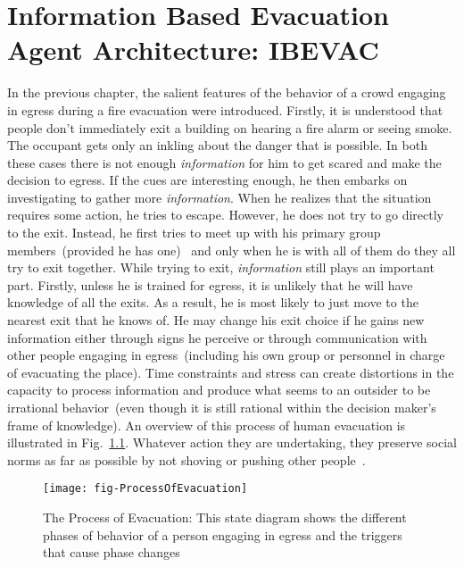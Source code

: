 
\chapter{Information Based Evacuation Agent Architecture: IBEVAC}
\label{chapter:IBEVAC}

In the previous chapter, the salient features of the behavior of a crowd engaging in egress during a fire evacuation were introduced. Firstly, it is understood that people don't immediately exit a building on hearing a fire alarm or seeing smoke. The occupant gets only an inkling about the danger that is possible. In both these cases there is not enough \emph{information} for him to get scared and make the decision to egress. If the cues are interesting enough, he then embarks on investigating to gather more \emph{information}. When he realizes that the situation requires some action, he tries to escape. However, he does not try to go directly to the exit. Instead, he first tries to meet up with his primary group members~(provided he has one)~\cite{Sime:1983uy,Torres:2010tj,Cornwell:2003uo,Aveni:1997wq} and only when he is with all of them do they all try to exit together. While trying to exit, \emph{information} still plays an important part. Firstly, unless he is trained for egress, it is unlikely that he will have knowledge of all the exits. As a result, he is most likely to just move to the nearest exit that he knows of. He may change his exit choice if he gains new information either through signs he perceive or through communication with other people engaging in egress~(including his own group or personnel in charge of evacuating the place). Time constraints and stress can create distortions in the capacity to process information and produce what seems to an outsider to be irrational behavior~(even though it is still rational within the decision maker's frame of knowledge). An overview of this process of human evacuation is illustrated in Fig.~\ref{fig:EvacuationProcess}. Whatever action they are undertaking, they preserve social norms as far as possible by not shoving or pushing other people~\cite{Cocking:2005uc,Drury:2009ga,Torres:2010tj}.
\begin{figure}[!htb]
\centering
\texttt{[image: fig-ProcessOfEvacuation]}
\caption[The Process of Evacuation]{The Process of Evacuation: This state diagram shows the different phases of behavior of a person engaging in egress and the triggers that cause phase changes}
\label{fig:EvacuationProcess}
\end{figure}

